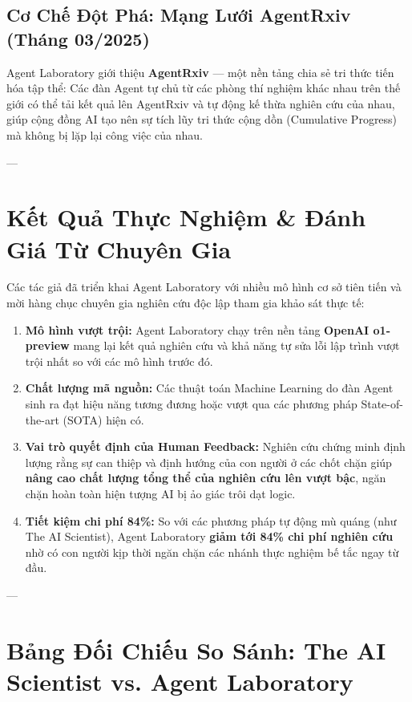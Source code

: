 \documentclass[11pt,a4paper]{article}
\begin{document}
\subsection{Cơ Chế Đột Phá: Mạng Lưới AgentRxiv (Tháng 03/2025)}
Agent Laboratory giới thiệu \textbf{AgentRxiv} — một nền tảng chia sẻ tri thức tiến hóa tập thể: Các đàn Agent tự chủ từ các phòng thí nghiệm khác nhau trên thế giới có thể tải kết quả lên AgentRxiv và tự động kế thừa nghiên cứu của nhau, giúp cộng đồng AI tạo nên sự tích lũy tri thức cộng dồn (Cumulative Progress) mà không bị lặp lại công việc của nhau.

---

\section{Kết Quả Thực Nghiệm \& Đánh Giá Từ Chuyên Gia}

Các tác giả đã triển khai Agent Laboratory với nhiều mô hình cơ sở tiên tiến và mời hàng chục chuyên gia nghiên cứu độc lập tham gia khảo sát thực tế:

\begin{benchmarkbox}
\begin{enumerate}[leftmargin=1.5em]
    \item \textbf{Mô hình vượt trội:} Agent Laboratory chạy trên nền tảng \textbf{OpenAI o1-preview} mang lại kết quả nghiên cứu và khả năng tự sửa lỗi lập trình vượt trội nhất so với các mô hình trước đó.
    \item \textbf{Chất lượng mã nguồn:} Các thuật toán Machine Learning do đàn Agent sinh ra đạt hiệu năng tương đương hoặc vượt qua các phương pháp State-of-the-art (SOTA) hiện có.
    \item \textbf{Vai trò quyết định của Human Feedback:} Nghiên cứu chứng minh định lượng rằng sự can thiệp và định hướng của con người ở các chốt chặn giúp \textbf{nâng cao chất lượng tổng thể của nghiên cứu lên vượt bậc}, ngăn chặn hoàn toàn hiện tượng AI bị ảo giác trôi dạt logic.
    \item \textbf{Tiết kiệm chi phí 84\%:} So với các phương pháp tự động mù quáng (như The AI Scientist), Agent Laboratory \textbf{giảm tới 84\% chi phí nghiên cứu} nhờ có con người kịp thời ngăn chặn các nhánh thực nghiệm bế tắc ngay từ đầu.
\end{enumerate}
\end{benchmarkbox}

---

\section{Bảng Đối Chiếu So Sánh: The AI Scientist vs. Agent Laboratory}
\end{document}

